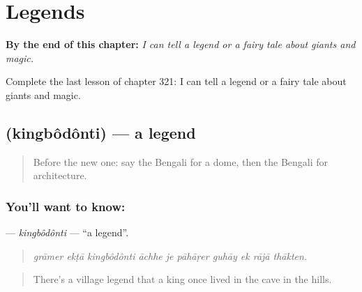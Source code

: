
\chapter{Legends}
\label{ch:bn-legends}

\begin{chapteropening}
\textbf{By the end of this chapter:} \emph{I can tell a legend or a fairy tale about giants and magic.}

Complete the last lesson of chapter 321: I can tell a legend or a fairy tale about giants and magic.
\end{chapteropening}

\section[\texorpdfstring{\bn{কিংবদন্তি} (kingbôdônti)}{কিংবদন্তি (kingbôdônti)}]{ (kingbôdônti) — a legend}

\label{lesson:BN-C321-kingbodonti}



\begin{quote}
Before the new one: say the Bengali for a dome, then the Bengali for architecture.
\end{quote}

\subsection*{You'll want to know: }
\textbf{} — \emph{kingbôdônti} — \textquotedblleft{}a legend\textquotedblright{}.

\begin{quote}
         
\end{quote}

\begin{quote}
\emph{grāmer ekṭā kingbôdônti āchhe je pāhāṛer guhāy ek rājā thākten.}
\end{quote}

\begin{quote}
There's a village legend that a king once lived in the cave in the hills.
\end{quote}

